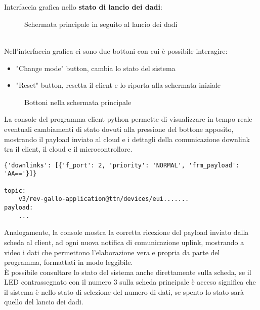 \\\\Interfaccia grafica nello \textbf{stato di lancio dei dadi}:
\begin{figure}[h!]
    \centering
    \caption{Schermata principale in seguito al lancio dei dadi}
    \label{fig:RollStateON}
\end{figure}
\\Nell'interfaccia grafica ci sono due bottoni con cui è possibile interagire:
\begin{itemize}
    \item "Change mode" button, cambia lo stato del sistema
    \item "Reset" button, resetta il client e lo riporta alla schermata iniziale
\end{itemize}
\begin{figure}[h!]
    \centering
    \caption{Bottoni nella schermata principale}
    \label{fig:HomePageButtons}
\end{figure}

La console del programma client python permette di visualizzare in tempo reale eventuali cambiamenti di stato dovuti alla pressione del bottone apposito, 
mostrando il payload inviato al cloud e i dettagli della comunicazione downlink tra il client, il cloud e il microcontrollore.

\begin{verbatim}
{'downlinks': [{'f_port': 2, 'priority': 'NORMAL', 'frm_payload': 'AA=='}]}

topic:
    v3/rev-gallo-application@ttn/devices/eui.......
payload:
    ...
\end{verbatim}

Analogamente, la console mostra la corretta ricezione del payload inviato dalla scheda al client, ad ogni nuova notifica di comunicazione uplink, 
mostrando a video i dati che permettono l'elaborazione vera e propria da parte del programma, formattati in modo leggibile.\\


È possibile consultare lo stato del sistema anche direttamente sulla scheda, se il LED contrassegnato con il numero 3 sulla scheda principale 
è acceso significa che il sistema è nello stato di selezione del numero di dati, se spento lo stato sarà quello del lancio dei dadi. %












